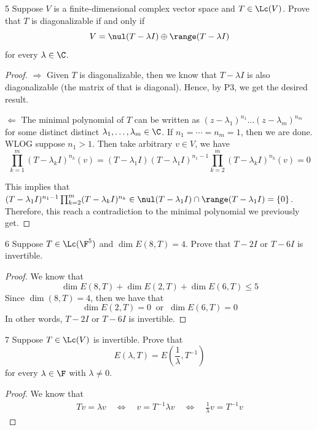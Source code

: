 \documentclass{extarticle}
\begin{document}
\begin{problem}{5}
    Suppose \(V\) is a finite-dimensional complex vector space and \(T \in \Lc(V)\). Prove that 
    \(T\) is diagonalizable if and only if 
    \[V= \nul (T - \lambda I) \oplus \range (T - \lambda I)\]
    for every \(\lambda \in \C\).
\end{problem}

\begin{proof}
\(\Rightarrow\) Given \(T\) is diagonalizable, then we know that \(T - \lambda I\) is also 
diagonalizable (the matrix of that is diagonal). Hence, by P3, we get the desired result. 

\(\Leftarrow\) The minimal polynomial of \(T\) can be written as 
\((z - \lambda_1)^{n_1}\ldots(z - \lambda_m)^{n_m}\) for some distinct distinct \(\lambda_1, \ldots, 
\lambda_m \in \C\). If \(n_1 = \cdots = n_m = 1\), then we are done. WLOG suppose \(n_1 > 1\). Then take 
arbitrary \(v \in V\), we have 
\[\prod_{k=1}^m (T - \lambda_k I)^{n_k} (v) = (T - \lambda_1 I)(T - \lambda_1 I)^{n_1 - 1} 
\prod_{k=2}^m (T - \lambda_k I)^{n_k}(v) = 0\]

This implies that \((T - \lambda_1 I)^{n_1 - 1} \prod_{k=2}^m (T - \lambda_k I)^{n_k} \in \nul (T - \lambda_1 I) 
\cap \range (T - \lambda_1 I) = \{0\}\). Therefore, this reach a contradiction to the minimal polynomial we 
previously get.
\end{proof}

\begin{problem}{6}
    Suppose \(T \in \Lc(\F^5)\) and \(\dim E(8, T) = 4\). Prove that \(T - 2 I\) or \(T - 6I\) is invertible. 
\end{problem}

\begin{proof}
We know that 
\[\dim E(8, T) + \dim E(2, T) + \dim E(6, T) \leq 5\]
Since \(\dim (8, T) = 4\), then we have that 
\[\dim E(2,T) = 0 \ \text{ or } \ \dim E(6, T) = 0\]
In other words, \(T - 2I\) or \(T - 6I\) is invertible. 
\end{proof}

\begin{problem}{7}
    Suppose \(T \in \Lc(V)\) is invertible. Prove that 
    \[E(\lambda, T) = E(\frac{1}{\lambda}, T^{-1})\]
    for every \(\lambda \in \F\) with \(\lambda \neq 0\). 
\end{problem}

\begin{proof}
We know that 
\begin{align*}
    Tv = \lambda v \quad \Longleftrightarrow \quad
    v = T^{-1} \lambda v  \quad \Longleftrightarrow \quad 
    \frac{1}{\lambda}v = T^{-1} v
\end{align*}
\end{proof}
\end{document}

